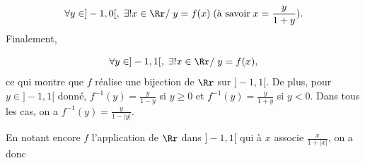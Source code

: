 {\begin{enumerate}
{$$\forall y\in]-1,0[,\;\exists!x\in\Rr/\;y=f(x)\;(\mbox{à savoir}\;x=\frac{y}{1+y}).$$
Finalement,

$$\forall y\in]-1,1[,\;\exists!x\in\Rr/\;y=f(x),$$
ce qui montre que $f$ réalise une bijection de $\Rr$ sur $]-1,1[$. De plus, pour $y\in]-1,1[$ donné,
$f^{-1}(y)=\frac{y}{1-y}$ si $y\geq0$ et $f^{-1}(y)=\frac{y}{1+y}$ si $y<0$. Dans tous les cas, on a
$f^{-1}(y)=\frac{y}{1-|y|}$.

En notant encore $f$ l'application de $\Rr$ dans $]-1,1[$ qui à $x$ associe $\frac{x}{1+|x|}$, on a donc
\begin{center}
\fbox{
$\forall x\in]-1,1[,\;f^{-1}(x)=\frac{x}{1-|x|}.$
}
\end{center}}
\end{enumerate}
}
